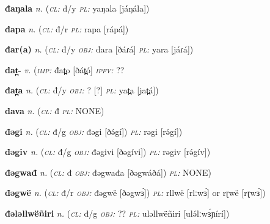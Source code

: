 \newentry
\headword\textbf{đaŋala}  
\ipa{[ðáŋála]}
\synpos\textit{n.} 
\class(\textit{\textsc{cl:}} {đ/y}
\plural\textit{\textsc{pl:}} yaŋala [já́ŋála])

\newentry
\headword\textbf{đapa}  
\ipa{[ðápá]}
\synpos\textit{n.} 
\class(\textit{\textsc{cl:}} {đ/r}
\plural\textit{\textsc{pl:}} rapa [rápá])

\newentry
\headword\textbf{đar(a)}  
\ipa{[ðáɾ(á)]}
\synpos\textit{n.} 
\class(\textit{\textsc{cl:}} {đ/y}
\object\textit{\textsc{obj:}} đara [ðáɾá]
\plural\textit{\textsc{pl:}} yara [jáɾá])

\newentry
\headword\textbf{đat̪-}
\ipa{[ðat̪-]}
\synpos\textit{v.} 
\imperative(\textit {\textsc{imp:}} đat̪o [ðát̪ó] 
\imperfective\textit{\textsc{ipfv:}} ?? %

\newentry
\headword\textbf{đat̪a}  
\ipa{[ðat̪á]}
\synpos\textit{n.} 
\class(\textit{\textsc{cl:}} {đ/y}
\object\textit{\textsc{obj:}} ? [?]
\plural\textit{\textsc{pl:}} yat̪a [jat̪á])

\newentry
\headword\textbf{đava}  
\ipa{[ðává]}
\synpos\textit{n.} 
\class(\textit{\textsc{cl:}} {đ}
\plural\textit{\textsc{pl:}} NONE)


\newentry
\headword\textbf{đəgi}  
\ipa{[ðə́gí]}
\synpos\textit{n.} 
\class(\textit{\textsc{cl:}} {đ/g}
\object\textit{\textsc{obj:}} đəgi [ðə́gí])
\plural\textit{\textsc{pl:}} rəgi [rə́gí])

\newentry
\headword\textbf{đəgiv}  
\ipa{[ðəgív]}
\synpos\textit{n.} 
\class(\textit{\textsc{cl:}} {đ/g}
\object\textit{\textsc{obj:}} đəgivi [ðəgívi])
\plural\textit{\textsc{pl:}} rəgiv [rə́gív])

\newentry
\headword\textbf{đəgwađ}  
\ipa{[ðəgwáð]}
\synpos\textit{n.} 
\class(\textit{\textsc{cl:}} {đ}
\object\textit{\textsc{obj:}} đəgwađa [ðəgwáðá])
\plural\textit{\textsc{pl:}} NONE)

\newentry
\headword\textbf{đəgwë}  
\ipa{[ðəgwɜ́]}
\synpos\textit{n.} 
\class(\textit{\textsc{cl:}} {đ/r}
\object\textit{\textsc{obj:}} đəgwë [ðəgwɜ́])
\plural\textit{\textsc{pl:}} rllwë [rlːwɜ́] or rɽwë [rɽwɜ́]) %

\newentry
\headword\textbf{đələllwëñiri}  
\synpos\textit{n.} 
\class(\textit{\textsc{cl:}} {đ/g}
\object\textit{\textsc{obj:}} ??
\plural\textit{\textsc{pl:}} uləllwëñiri [ulə́lːwɜ́ɲírí])

